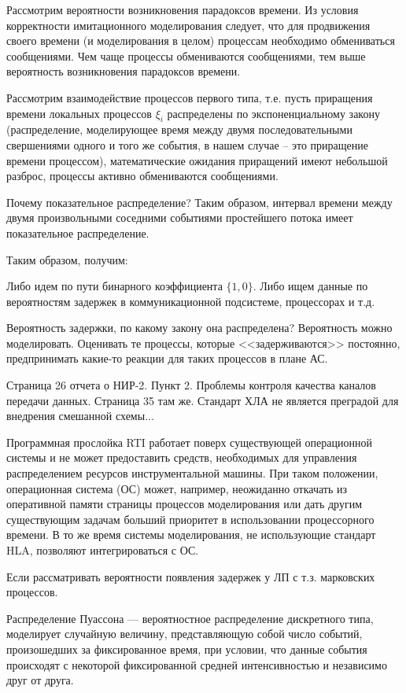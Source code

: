 Рассмотрим вероятности возникновения парадоксов времени.
Из условия корректности имитационного моделирования следует, что для продвижения своего времени (и моделирования в целом) процессам необходимо обмениваться сообщениями. Чем чаще процессы обмениваются сообщениями, тем выше вероятность возникновения парадоксов времени. 

Рассмотрим взаимодействие процессов первого типа, т.е. пусть приращения времени локальных процессов $\xi_i$ распределены по экспоненциальному закону (распределение, моделирующее время между двумя последовательными свершениями одного и того же события, в нашем случае -- это приращение времени процессом), математические ожидания приращений имеют небольшой разброс, процессы активно обмениваются сообщениями.

Почему показательное распределение? Таким образом, интервал времени между двумя произвольными соседними
событиями простейшего потока имеет показательное распределение.

Таким образом, получим:

Либо идем по пути бинарного коэффициента $\{1,0\}$. Либо ищем данные по вероятностям задержек в коммуникационной подсистеме, процессорах и т.д.

Вероятность задержки, по какому закону она распределена? Вероятность можно моделировать. Оценивать те процессы, которые <<задерживаются>> постоянно, предпринимать какие-то реакции для таких процессов в плане АС.

Страница 26 отчета о НИР-2. Пункт 2. Проблемы контроля качества каналов передачи данных. Страница 35 там же. Стандарт ХЛА не является преградой для внедрения смешанной схемы...




Программная прослойка RTI работает поверх существующей операционной системы и не может предоставить средств, необходимых для управления распределением ресурсов инструментальной машины. При таком положении, операционная система (ОС) может, например, неожиданно откачать из оперативной памяти страницы процессов моделирования или дать другим существующим задачам больший приоритет в использовании процессорного времени. В то же время системы моделирования, не использующие стандарт HLA, позволяют интегрироваться с ОС.

Если рассматривать вероятности появления задержек у ЛП с т.з. марковских процессов.

Распределение Пуассона — вероятностное распределение дискретного типа, моделирует случайную величину, представляющую собой число событий, произошедших за фиксированное время, при условии, что данные события происходят с некоторой фиксированной средней интенсивностью и независимо друг от друга.

